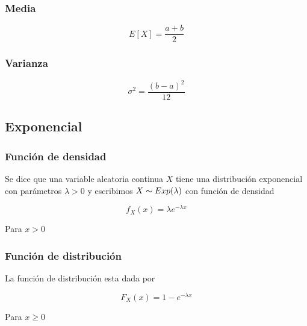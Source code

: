 \documentclass{article}
\begin{document}
            \subsubsection{Media}

                \begin{equation*}
                    E[X] = \frac{a+b}{2}
                \end{equation*}
                
            \subsubsection{Varianza}

                \begin{equation*}
                    \sigma ^2 = \frac{(b-a)^2}{12}
                \end{equation*}

        \subsection{Exponencial}

            \subsubsection{Función de densidad}

                Se dice que una variable aleatoria continua $X$ tiene una distribución exponencial con parámetros $\lambda > 0 $ y escribimos $X\thicksim Exp(\lambda)$ con función de densidad

                    \begin{equation*}
                        f_X (x) = \lambda e^{-\lambda x}
                    \end{equation*}

                Para $x>0$

            \subsubsection{Función de distribución}

                La función de distribución esta dada por

                    \begin{equation*}
                        F_X (x) =1-e^{-\lambda x}
                    \end{equation*}

                Para $x\geq 0$ 
\end{document}
